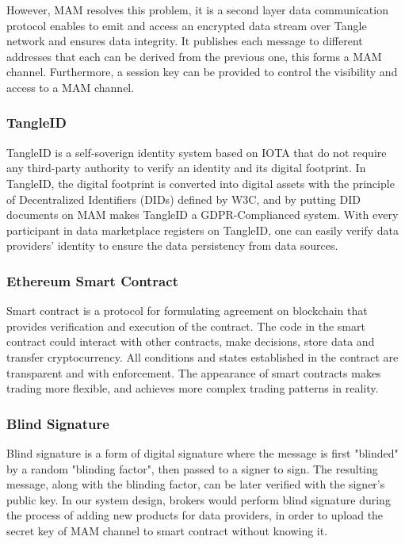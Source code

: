 \documentclass[journal,a4paper]{IEEEtran}
\begin{document}
However, MAM resolves this problem, it is a second layer data communication protocol enables to emit and access an encrypted data stream over Tangle network and ensures data integrity. 
It publishes each message to different addresses that each can be derived from the previous one, this forms a MAM channel. Furthermore, a session key can be provided to control the visibility and access to a MAM channel.

\subsubsection{TangleID}
TangleID\cite{TangleID} is a self-soverign identity system based on IOTA that do not require any third-party authority to verify an identity and its digital footprint. In TangleID, the digital footprint is converted into digital assets with the principle of Decentralized Identifiers (DIDs)\cite{DID} defined by W3C, and by putting DID documents on MAM makes TangleID a GDPR-Complianced system. With every participant in data marketplace registers on TangleID, one can easily verify data providers' identity to ensure the data persistency from data sources.

\subsubsection{Ethereum Smart Contract}
Smart contract\cite{smartContract} is a protocol for formulating agreement on blockchain that provides verification and execution of the contract. The code in the smart contract could interact with other contracts, make decisions, store data and transfer cryptocurrency. All conditions and states established in the contract are transparent and with enforcement. The appearance of smart contracts makes trading more flexible, and achieves more complex trading patterns in reality.

\subsubsection{Blind Signature}
Blind signature\cite{blindSig} is a form of digital signature where the message is first "blinded" by a random "blinding factor", then passed to a signer to sign. The resulting message, along with the blinding factor, can be later verified with the signer's public key. In our system design, brokers would perform blind signature during the process of adding new products for data providers, in order to upload the secret key of MAM channel to smart contract without knowing it.
\end{document}

